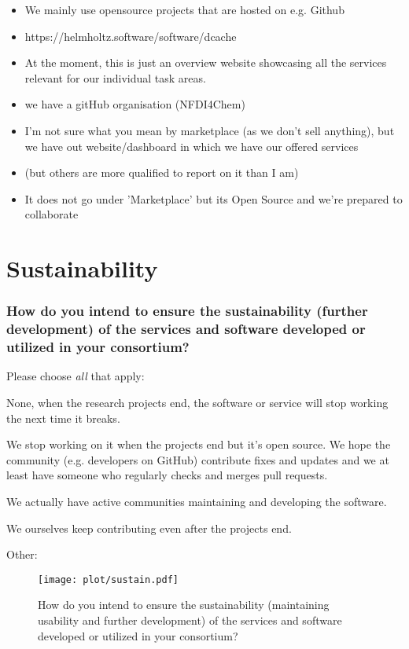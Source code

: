 \documentclass[headsepline,titlepage,twoside,12pt,toc=flat,headings=normal]{scrreprt}
\newcommand{\question}[1]{\subsubsection{#1}}
\newcommand{\otherbox}{\fbox{\phantom{This is how big an answer would be.}}}
\begin{document}
\begin{itemize}
\item We mainly use opensource projects that are hosted on e.g. Github
\item https://helmholtz.software/software/dcache
\item At the moment, this is just an overview website showcasing all the services relevant for our individual task areas.
\item we have a gitHub organisation (NFDI4Chem)
\item I'm not sure what you mean by marketplace (as we don't sell anything), but we have out website/dashboard in which we have our offered services
\item (but others are more qualified to report on it than I am)
\item It does not go under 'Marketplace' but its Open Source and we're prepared to collaborate
\end{itemize}

\section{Sustainability}
\question{How do you intend to ensure the sustainability (further development) of the services and software developed or utilized in your consortium?}

Please choose \emph{all} that apply:

\begin{answers}
\item None, when the research projects end, the software or service will stop working the next time it breaks.
\item We stop working on it when the projects end but it's
  open source.
We hope the community (e.g. developers on GitHub)
  contribute fixes and updates and we at least have someone who
  regularly checks and merges pull requests.
\item We actually have active communities maintaining and developing the
  software.
\item We ourselves keep contributing even after the projects end.
\item Other: \otherbox
\end{answers}

\begin{figure}[h!]
\caption{How do you intend to ensure the sustainability (maintaining usability and further development) of the services and software developed or utilized in your consortium?}
\label{fig:sustain}
\texttt{[image: plot/sustain.pdf]}
\end{figure}
\end{document}

